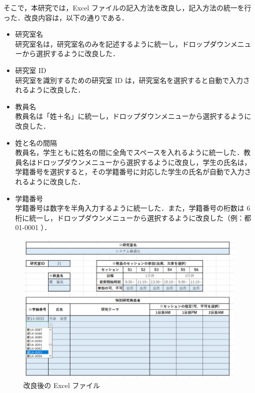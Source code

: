 \documentclass[a4paper,12pt,fleqn]{jarticle}
\begin{document}
そこで，本研究では，Excel ファイルの記入方法を改良し，記入方法の統一を行った．改良内容は，以下の通りである．
\begin{itemize}
\item 研究室名\\
研究室名は，研究室名のみを記述するように統一し，ドロップダウンメニューから選択するように改良した．
\item 研究室 ID\\
研究室を識別するための研究室 ID は，研究室名を選択すると自動で入力されるように改良した．
\item 教員名\\
教員名は「姓＋名」に統一し，ドロップダウンメニューから選択するように改良した．
\item 姓と名の間隔\\
教員名，学生ともに姓名の間に全角でスペースを入れるように統一した．教員名はドロップダウンメニューから選択するように改良し，学生の氏名は，学籍番号を選択すると，その学籍番号に対応した学生の氏名が自動で入力されるように改良した．
\item 学籍番号\\
学籍番号は数字を半角入力するように統一した．また，学籍番号の桁数は $6$ 桁に統一し，ドロップダウンメニューから選択するように改良した（例：都 01-0001 ）．
\end{itemize}
\begin{figure}[H]
  \begin{center}
    \includegraphics[scale=0.8]{dropdown.png}
    \caption{改良後の Excel ファイル}
    \label{fig:dropdown}
  \end{center}
\end{figure}
\end{document}
